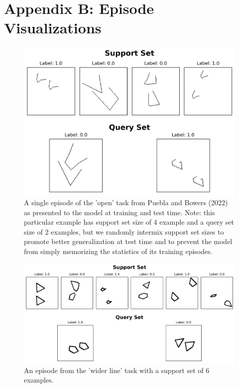 \documentclass[10pt,letterpaper]{article}
\begin{document}
\clearpage

\section{Appendix B: Episode Visualizations}

\begin{figure}[H]
    \centering
    \includegraphics[width=0.9\columnwidth]{figures/open_support4_ep0_boxed.png}
    \caption{A single episode of the 'open' task from Puebla and Bowers (2022) as presented to the model at training and test time. Note: this particular example has support set size of 4 example and a query set size of 2 examples, but we randomly intermix support set sizes to promote better generalization at test time and to prevent the model from simply memorizing the statistics of its training episodes. 
    }
    \label{fig:open_episode}
\end{figure}

\begin{figure}[H]
    \centering
    \includegraphics[width=0.9\columnwidth]{figures/wider_line_support6_ep0_boxed.png}
    \caption{An episode from the 'wider line' task with a support set of 6 examples.}
    \label{fig:wider_line_episode}
\end{figure}
\end{document}

